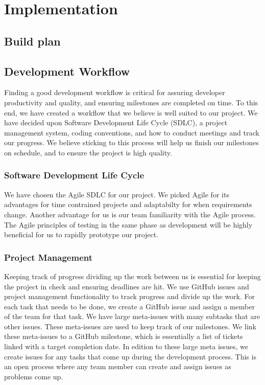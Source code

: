 \section{Implementation}

\subsection{Build plan}

\subsection{Development Workflow}

Finding a good development workflow is critical for assuring developer productivity and
quality, and ensuring milestones are completed on time. To this end, we have created a
workflow that we believe is well suited to our project. We have decided upon Software
Development Life Cycle (SDLC), a project management system, coding conventions, and how to
conduct meetings and track our progress. We believe sticking to this process will help us
finish our milestones on schedule, and to ensure the project is high quality.

\subsubsection{Software Development Life Cycle}

We have chosen the Agile SDLC for our project. We picked Agile for its advantages for time
contrained projects and adaptabilty for when requirements change. Another advantage for us
is our team familiarity with the Agile process. The Agile principles of testing in the
same phase as development will be highly beneficial for us to rapidly prototype our
project.

\subsubsection{Project Management}

Keeping track of progress dividing up the work between us is essential for keeping the
project in check and ensuring deadlines are hit. We use GitHub issues and project
management functionality to track progress and divide up the work. For each task that
needs to be done, we create a GitHub issue and assign a member of the team for that task.
We have large meta-issues with many subtasks that are other issues. These meta-issues are
used to keep track of our milestones. We link these meta-issues to a GitHub milestone,
which is essentially a list of tickets linked with a target completion date. In edition to
these large meta issues, we create issues for any tasks that come up during the
development process. This is an open process where any team member can create and assign
issues as problems come up.


